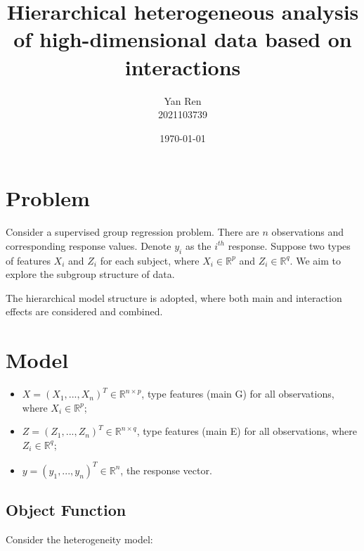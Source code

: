 \documentclass[12pt, a4paper, oneside]{article}
\title{\textbf{Hierarchical heterogeneous analysis of high-dimensional data
		based on interactions}}
\author{Yan Ren \\ 2021103739}
\date{\today}
\numberwithin{equation}{section}
\begin{document}
	
\maketitle
\newpage
\tableofcontents
\newpage

\section{Problem} %
\label{sec:problem}

Consider a supervised group regression problem. There are $n$ observations and corresponding response values. Denote $y_i$ as the $i^{th}$ response. Suppose two types of features $X_i$ and $Z_i$ for each subject, where $X_i \in \mathbb{R}^{p}$ and $Z_i \in \mathbb{R}^{q}$. We aim to explore the subgroup structure of data. 

The hierarchical model structure is adopted, where both main and interaction effects are considered and combined.

\section{Model} %
\label{sec:model}

\begin{itemize}
	\item $X = (X_1,...,X_n)^{T} \in \mathbb{R}^{n\times p}$, type \uppercase\expandafter{} features (main G) for all observations, where $X_i \in \mathbb{R}^{p}$;
	\item $Z = (Z_1,...,Z_n)^{T} \in \mathbb{R}^{n\times q}$, type \uppercase\expandafter{} features (main E) for all observations, where $Z_i \in \mathbb{R}^{q}$;
	\item $y = (y_1,...,y_n)^{T} \in \mathbb{R}^{n}$, the response vector.
\end{itemize}


\subsection{Object Function}
\label{subsec:object-function}

Consider the heterogeneity model:
\end{document}
